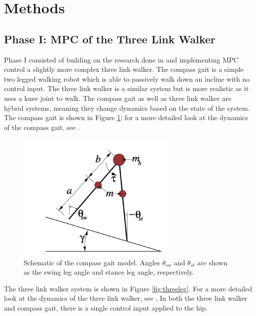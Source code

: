 \documentclass{./springer/svjour3}
\begin{document}
\section{Methods}

\subsection{Phase I: MPC of the Three Link Walker}

Phase I consisted of building on the research done in \cite{Howell2024} and implementing MPC control a slightly more complex three link walker.
The compass gait is a simple two legged walking robot which is able to passively walk down an incline with no control input. The three link walker is a similar system 
but is more realistic as it uses a knee joint to walk. The compass gait as well as three link walker are hybrid systems, meaning they change dynamics based on the state of the system.
The compass gait is shown in Figure \ref{fig:compass_gait}; for a more detailed look at the dynamics of the compass gait, see \cite{Howell2024}.

\begin{figure}[!h]
  \centering
  \includegraphics[width=8cm]{./figures/compassgaitmodel.png}
  \caption{Schematic of the compass gait model. Angles $\theta_{sw}$ and $\theta_{st}$ are shown as the swing leg angle and stance leg angle, respectively.}
  \label{fig:compass_gait}
\end{figure}

The three link walker system is shown in Figure \ref{fig:threeleg}. For a more detailed look at the dynamics of the three link walker, see \cite{Chen2007PassiveDW}. In both the three link walker and
compass gait, there is a single control input applied to the hip.
\end{document}
